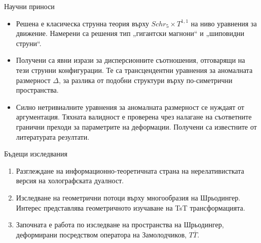 \documentclass[bulg]{beamer}
\begin{document}
\begin{frame}
  \footnotesize
  \begin{alertblock}{\small Научни приноси}
    \begin{itemize}
      \item Решена е класическа струнна теория върху $Schr_5\times T^{1,1}$ на
        ниво уравнения за движение. Намерени са решения тип „гигантски
        магнони“ и „шиповидни струни“.
      \item Получени са явни изрази за дисперсионните съотношения,
        отговарящи на тези струнни конфигурации. Те са трансцендентни уравнения
        за аномалната размерност $\Delta$, за разлика от подобни структури върху
        по-симетрични пространства.
      \item Силно нетривиалните уравнения за аномалната размерност се нуждаят от
        аргументация. Тяхната валидност е проверена чрез налагане на
        съответните гранични преходи за параметрите на деформации. Получени са
        известните от литературата резултати.
    \end{itemize}
  \end{alertblock}


  \begin{alertblock}{\small Бъдещи изследвания}
    \begin{enumerate}
      \item Разглеждане на информационно-теоретичната страна на нерелативистката
        версия на холографската дуалност.
      \item Изследване на геометрични потоци върху многообразия на Шрьодингер.
        Интерес представлява геометричното изучаване на TsT трансформацията.
      \item Започната е работа по изследване на пространства на Шрьодингер,
        деформирани посредством оператора на Замолодчиков, $T\overline{T}$.
    \end{enumerate}
  \end{alertblock}
\end{frame}
\end{document}
